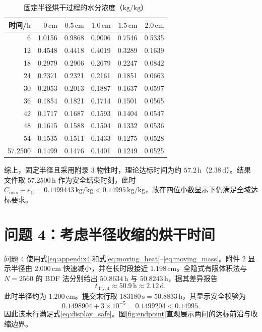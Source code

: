 \documentclass[UTF8,a4paper,zihao=-4,fontset=fandol]{ctexart}
\newcommand{\unit}[1]{\,\mathrm{#1}}
\begin{document}
\begin{table}[H]
\centering
\caption{固定半径烘干过程的水分浓度（$\mathrm{kg/kg}$）}
\label{tab:q3}
\small
\begin{tabular}{rrrrrr}
\toprule
时间/$\mathrm{h}$ & $0\unit{cm}$ & $0.5\unit{cm}$ & $1.0\unit{cm}$ & $1.5\unit{cm}$ & $2.0\unit{cm}$ \\
\midrule
6  & 1.0156 & 0.9868 & 0.9006 & 0.7546 & 0.5335 \\
12 & 0.4548 & 0.4418 & 0.4019 & 0.3289 & 0.1639 \\
18 & 0.2979 & 0.2906 & 0.2679 & 0.2247 & 0.0842 \\
24 & 0.2371 & 0.2321 & 0.2161 & 0.1851 & 0.0663 \\
30 & 0.2053 & 0.2013 & 0.1887 & 0.1637 & 0.0597 \\
36 & 0.1854 & 0.1821 & 0.1714 & 0.1501 & 0.0565 \\
42 & 0.1717 & 0.1687 & 0.1593 & 0.1404 & 0.0547 \\
48 & 0.1615 & 0.1588 & 0.1504 & 0.1332 & 0.0536 \\
54 & 0.1535 & 0.1511 & 0.1433 & 0.1275 & 0.0528 \\
57.2500 & 0.1499 & 0.1476 & 0.1401 & 0.1249 & 0.0525 \\
\bottomrule
\end{tabular}
\end{table}

综上，固定半径且采用附录 3 物性时，理论达标时间为约 $57.2\unit{h}$（$2.38\unit{d}$）。结果文件取 $57.2500\unit{h}$ 作为安全结束时刻，此时 $C_{\max}+\varepsilon_C=0.1499443\unit{kg/kg}<0.14995\unit{kg/kg}$，故在四位小数显示下仍满足全域达标要求。

\section{问题 4：考虑半径收缩的烘干时间}

问题 4 使用式\eqref{eq:appendix4}和式\eqref{eq:moving_heat}--\eqref{eq:moving_mass}。附件 2 显示半径由 $2.000\unit{cm}$ 快速减小，并在长时段接近 $1.198\unit{cm}$。全隐式有限体积法与 $N=2560$ 的 BDF 法分别给出 $50.8634\unit{h}$ 与 $50.8243\unit{h}$，据其差异报告
\begin{equation}
t_{\mathrm{dry},4}\approx50.9\unit{h}\approx2.12\unit{d},
\end{equation}
此时半径约为 $1.200\unit{cm}$。提交末行取 $183180\unit{s}=50.8833\unit{h}$，其显示安全校验为
\begin{equation}
0.1498904+3\times10^{-5}=0.1499204<0.14995.
\end{equation}
因此该末行满足式\eqref{eq:display_safe}。图\ref{fig:endpoint}直观展示两问的达标前沿与收缩边界。
\end{document}
